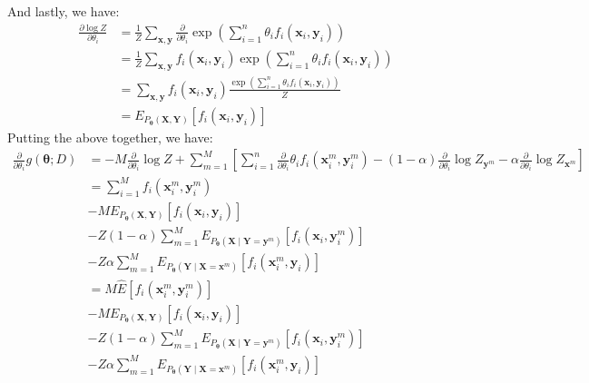 \documentclass[12pt]{article}
\newcommand{\vect}[1]{\boldsymbol{#1}}
\begin{document}
\begin{enumerate}[label=(\alph*)]
$$  $$
  And lastly, we have:
  \begin{align*}
  	\frac{\partial \log Z}{\partial \theta_i} &= \frac{1}{Z} \sum_{\vect{x}, \vect{y}} \frac{\partial}{\partial \theta_i} \exp\left(\sum_{i =1}^n \theta_i f_i(\vect{x}_i, \vect{y}_i)\right) \\
  	&= \frac{1}{Z} \sum_{\vect{x}, \vect{y}} f_i(\vect{x}_i, \vect{y}_i) \exp\left(\sum_{i =1}^n \theta_i f_i(\vect{x}_i, \vect{y}_i)\right)  \\
  	&= \sum_{\vect{x}, \vect{y}} f_i(\vect{x}_i, \vect{y}_i) \frac{\exp\left(\sum_{i =1}^n \theta_i f_i(\vect{x}_i, \vect{y}_i)\right) }{Z} \\
  	&= E_{P_{\vect{\theta}}(\vect{X}, \vect{Y})}[f_i(\vect{x}_i, \vect{y}_i)]
  \end{align*}
  Putting the above together, we have:
  \begin{align*}
  	\frac{\partial }{\partial \theta_i}g(\vect{\theta};D) &= -M\frac{\partial }{\partial \theta_i} \log Z + \sum_{m=1}^M\left[ \sum_{i=1}^n \frac{\partial }{\partial \theta_i} \theta_i f_i(\vect{x}_i^m, \vect{y}_i^m) - (1-\alpha)\frac{\partial }{\partial \theta_i} \log Z_{\vect{y}^m} - \alpha \frac{\partial }{\partial \theta_i}\log Z_{\vect{x}^m} \right] \\
  	&= \sum_{i=1}^M f_i(\vect{x}_i^m, \vect{y}_i^m) \\
  	&- ME_{P_{\vect{\theta}}(\vect{X}, \vect{Y})}[f_i(\vect{x}_i, \vect{y}_i)] \\
  	&- Z(1-\alpha)\sum_{m=1}^M E_{P_{\vect{\theta}}(\vect{X} \mid \vect{Y} = \vect{y}^{m})}[f_i(\vect{x}_i, \vect{y}_i^m)] \\
  	&- Z\alpha\sum_{m=1}^M E_{P_{\vect{\theta}}(\vect{Y} \mid \vect{X} = \vect{x}^{m})}[f_i(\vect{x}_i^m, \vect{y}_i)] \\
  	&= M\hat{E}[f_i(\vect{x}_i^m, \vect{y}_i^m)] \tag{Sample Mean} \\
  	&- ME_{P_{\vect{\theta}}(\vect{X}, \vect{Y})}[f_i(\vect{x}_i, \vect{y}_i)] \tag{True Mean}\\
  	&- Z(1-\alpha)\sum_{m=1}^M E_{P_{\vect{\theta}}(\vect{X} \mid \vect{Y} = \vect{y}^{m})}[f_i(\vect{x}_i, \vect{y}_i^m)] \tag{Conditional Expectation $X \mid Y$}\\
  	&- Z\alpha\sum_{m=1}^M E_{P_{\vect{\theta}}(\vect{Y} \mid \vect{X} = \vect{x}^{m})}[f_i(\vect{x}_i^m, \vect{y}_i)] \tag{Condtional Expectation $Y \mid X$}
  \end{align*}
\end{enumerate}
\end{document}
